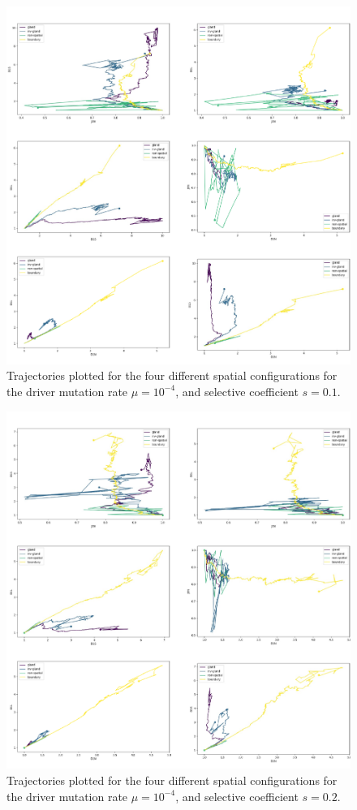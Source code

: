 \begin{figure}[h]
\centering
\includegraphics[width=\textwidth]{Chapter_3/figures/1e0401new.pdf}
\caption{Trajectories plotted for the four different spatial configurations for
    the driver mutation rate $\mu=10^{-4}$, and selective coefficient
    $s=0.1$.}
\label{fig:1e0401new}
\end{figure}

\begin{figure}[h]
\centering
\includegraphics[width=\textwidth]{Chapter_3/figures/1e0402new.pdf}
\caption{Trajectories plotted for the four different spatial configurations for
    the driver mutation rate $\mu=10^{-4}$, and selective coefficient
    $s=0.2$.}
\label{fig:1e0402new}
\end{figure}

